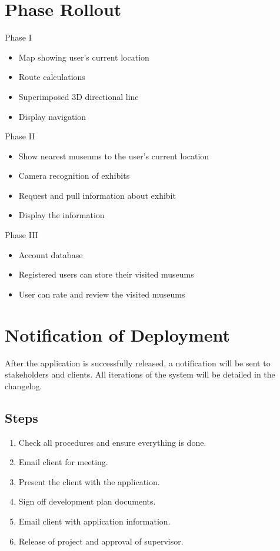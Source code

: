 \section{Phase Rollout}
Phase I
\begin{itemize}
    \item Map showing user's current location
    \item Route calculations
    \item Superimposed 3D directional line
    \item Display navigation
\end{itemize}
Phase II
\begin{itemize}
    \item Show nearest museums to the user's current location
    \item Camera recognition of exhibits
    \item Request and pull information about exhibit
    \item Display the information
\end{itemize}
Phase III
\begin{itemize}
    \item Account database
    \item Registered users can store their visited museums
    \item User can rate and review the visited museums
\end{itemize}

\section{Notification of Deployment}
After the application is successfully released, a notification will be sent to stakeholders and clients. All iterations of the system will be detailed in the changelog.

\subsection{Steps}
\begin{enumerate}
    \item Check all procedures and ensure everything is done.
    \item Email client for meeting.
    \item Present the client with the application.
    \item Sign off development plan documents.
    \item Email client with application information.
    \item Release of project and approval of supervisor.
\end{enumerate}

